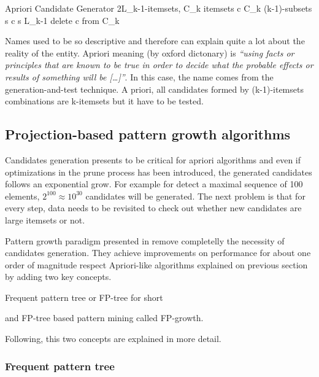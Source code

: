 \begin{pseudocode}{Apriori Candidate Generator 2}{L_{k-1}-itemsets, C_{k}}
\label{pc:apriori_candidate_generator2}
    \FORALL itemsets \quad c \in C_{k} \DO
    \BEGIN
        \FORALL (k-1)-subsets \quad s \in c \DO
        \BEGIN
            \IF s \not\in  L_{k-1} \THEN
                delete \quad c \quad from \quad C_{k}\\
        \END
    \END
\end{pseudocode}

Names used to be so descriptive and therefore can explain quite a lot about the
reality of the entity. Apriori meaning (by oxford dictonary) is {\it “using facts or
principles that are known to be true in order to decide what the probable
effects or results of something will be [\dots]”}. In this case, the name comes
from the generation-and-test technique. A priori, all candidates formed by
(k-1)-itemsets combinations are k-itemsets but it have to be tested.

\subsection{Projection-based pattern growth
algorithms}\label{ss:projection_based}

Candidates generation presents to be critical for apriori algorithms and even if
optimizations in the prune process has been introduced, the generated candidates
follows an exponential grow. For example for detect a maximal sequence of 100
elements, $2^{100} \approx 10^{30}$ candidates will be generated. The next
problem is that for every step, data needs to be revisited to check out whether 
new candidates are large itemsets or not. 

Pattern growth paradigm presented in \cite{han2000mining1} remove
completelly the necessity of candidates generation. They achieve improvements on
performance for about one order of magnitude respect Apriori-like algorithms
explained on previous section by adding two key concepts. 
\begin{enumerate*}[label=(\roman*)]
  \item Frequent pattern tree or FP-tree for short
  \item and FP-tree based pattern mining called FP-growth.
\end{enumerate*}
Following, this two concepts are explained in more detail.

\subsubsection{Frequent pattern tree}\label{ss:frequent_pattern_tree}

